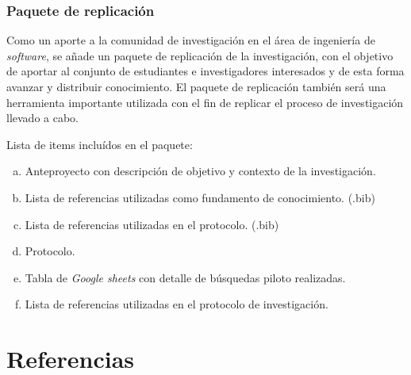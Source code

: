 \documentclass{article}
\begin{document}
\subsubsection{Paquete de replicación}
Como un aporte a la comunidad de investigación en el área de ingeniería de \emph{software}, 
se añade un paquete de replicación de la investigación, con el objetivo de aportar  
al conjunto de estudiantes e investigadores interesados y de esta forma avanzar y distribuir 
conocimiento.
El paquete de replicación también será una herramienta importante utilizada con el fin de replicar 
el proceso de investigación llevado a cabo.

Lista de items incluídos en el paquete: 
  \begin{enumerate}[(a)]
  \item Anteproyecto con descripción de objetivo y contexto de la investigación. 
  \item Lista de referencias utilizadas como fundamento de conocimiento. (.bib)
  \item Lista de referencias utilizadas en el protocolo.  (.bib)
  \item Protocolo.
  \item Tabla de \emph{Google sheets} con detalle de búsquedas piloto realizadas. 
  \item Lista de referencias utilizadas en el protocolo de investigación.
  \end{enumerate}
\newpage

\section{Referencias}
\printbibliography
\end{document}
